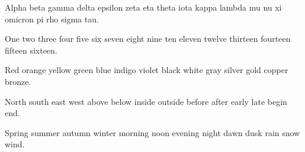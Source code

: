 
\hsize=220pt \vsize=240pt
Alpha beta gamma delta epsilon zeta eta theta iota kappa lambda mu nu xi omicron pi rho sigma tau.

One two three four five six seven eight nine ten eleven twelve thirteen fourteen fifteen sixteen.

Red orange yellow green blue indigo violet black white gray silver gold copper bronze.

North south east west above below inside outside before after early late begin end.

Spring summer autumn winter morning noon evening night dawn dusk rain snow wind.
\bye
